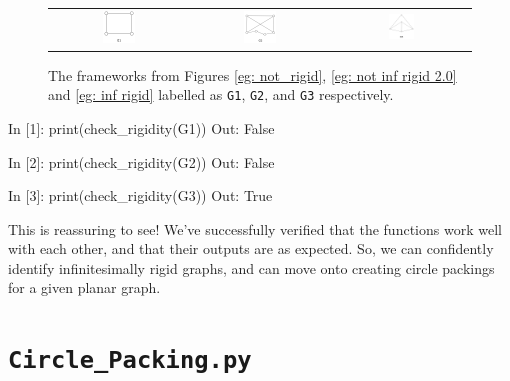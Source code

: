 \begin{figure}[htbp]
    \centering
    \begin{tabular}{c c c}
        \includegraphics[width = 0.25\textwidth]{Chapter 4/6. not_rigid.png} 
        & \includegraphics[width = 0.25\textwidth]{Chapter 4/7. not_inf_rigid_2.0.png} &
        \includegraphics[width=0.2\textwidth]{Chapter 4/8. inf_rigid.png}        
    \end{tabular}
    \caption{The frameworks from Figures \ref{eg: not_rigid}, \ref{eg: not inf rigid 2.0} and \ref{eg: inf rigid} labelled as \texttt{G1}, \texttt{G2}, and \texttt{G3} respectively.}
\end{figure}

\begin{code}
    In [1]: print(check_rigidity(G1))
    Out: False 
    
    In [2]: print(check_rigidity(G2))
    Out: False
    
    In [3]: print(check_rigidity(G3))
    Out: True
\end{code}

\begin{flushleft}
This is reassuring to see! We've successfully verified that the functions work well with each other, and that their outputs are as expected. So, we can confidently identify infinitesimally rigid graphs, and can move onto creating circle packings for a given planar graph. 
\end{flushleft}

\section{\texttt{Circle\_Packing.py}}

